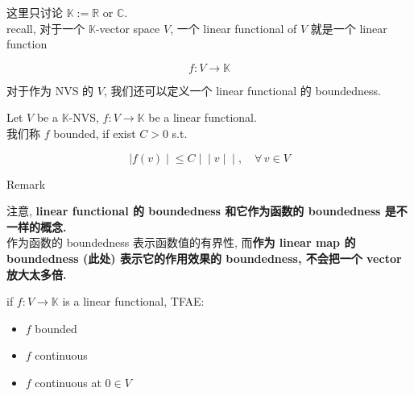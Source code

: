 这里只讨论 \(\mathbb{K} := \mathbb{R}\) or \(\mathbb{C}\).\\
recall, 对于一个 \(\mathbb{K}\)-vector space \(V\), 一个 linear functional of \(V\) 就是一个 linear function

\[f:V\rightarrow\mathbb{K}\]

对于作为 NVS 的 \(V\), 我们还可以定义一个 linear functional 的 boundedness.

\begin{definition}{}

Let \(V\) be a \(\mathbb{K}\)-NVS, \(f:V\rightarrow\mathbb{K}\) be a linear functional.\\
我们称 \(f\) bounded, if exist \(C > 0\) s.t.

\[\left. |f(v) \middle| \leq C \middle| \middle| v \middle| \middle| ,\quad\forall\, v \in V \right.\]

\end{definition}

\begin{qlremark}{Remark}

注意, \textbf{linear functional 的 boundedness 和它作为函数的 boundedness 是不一样的概念.}\\
作为函数的 boundedness 表示函数值的有界性, 而\textbf{作为 linear map 的 boundedness (此处) 表示它的作用效果的 boundedness, 不会把一个 vector 放大太多倍.}

\end{qlremark}

\begin{proposition}{}

if \(f:V\rightarrow\mathbb{K}\) is a linear functional, TFAE:

\begin{itemize}
\item
  \(f\) bounded
\item
  \(f\) continuous
\item
  \(f\) continuous at \(0 \in V\)
\end{itemize}

\end{proposition}

